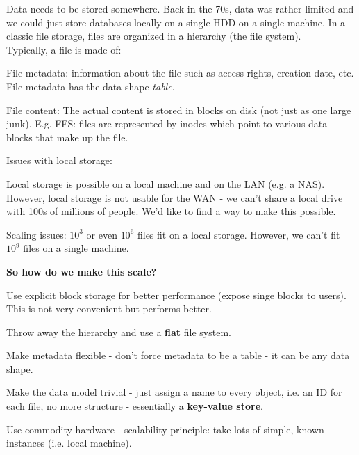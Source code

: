 \documentclass[11pt,oneside,a4paper]{article}
\begin{document}
Data needs to be stored somewhere. Back in the 70s, data was rather limited and we could just store databases locally on a single HDD on a single machine. In a classic file storage, files are organized in a hierarchy (the file system).\\
Typically, a file is made of:

\begin{compactitem}
	\item File metadata: information about the file such as access rights, creation date, etc. File metadata has the data shape \textit{table}.
	\item File content: The actual content is stored in blocks on disk (not just as one large junk). E.g. FFS: files are represented by inodes which point to various data blocks that make up the file.
\end{compactitem}

Issues with local storage:
\begin{compactitem}
	\item Local storage is possible on a local machine and on the LAN (e.g. a NAS). However, local storage is not usable for the WAN - we can't share a local drive with 100s of millions of people. We'd like to find a way to make this possible.
	\item Scaling issues: $10^3$ or even $10^6$ files fit on a local storage. However, we can't fit $10^9$ files on a single machine.\\
\end{compactitem}

\textbf{So how do we make this scale?}

\begin{compactitem}
	\item Use explicit block storage for better performance (expose singe blocks to users). This is not very convenient but performs better.
	\item Throw away the hierarchy and use a \textbf{flat} file system.
	\item Make metadata flexible - don't force metadata to be a table - it can be any data shape.
	\item Make the data model trivial - just assign a name to every object, i.e. an ID for each file, no more structure - essentially a \textbf{key-value store}.
	\item Use commodity hardware - scalability principle: take lots of simple, known instances (i.e. local machine).\\
\end{compactitem}
\end{document}
